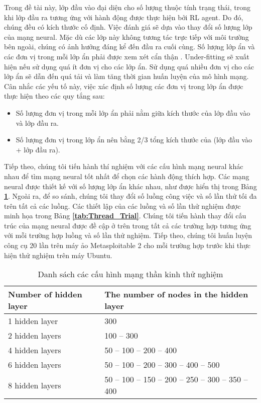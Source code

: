 Trong đề tài này, lớp đầu vào đại diện cho số lượng thuộc tính trạng thái, trong khi lớp đầu ra tương ứng với hành động được thực hiện bởi RL agent. Do đó, chúng đều có kích thước cố định. Việc đánh giá sẽ dựa vào thay đổi số lượng lớp của mạng neural. Mặc dù các lớp này không tương tác trực tiếp với môi trường bên ngoài, chúng có ảnh hưởng đáng kể đến đầu ra cuối cùng. Số lượng lớp ẩn và các đơn vị trong mỗi lớp ẩn phải được xem xét cẩn thận \cite{heaton2008introduction}. Under-fitting \cite{jabbar2015methods} sẽ xuất hiện nếu sử dụng quá ít đơn vị cho các lớp ẩn. Sử dụng quá nhiều đơn vị cho các lớp ẩn sẽ dẫn đến quá tải và làm tăng thời gian huấn luyện của mô hình mạng. Cân nhắc các yếu tố này, việc xác định số lượng các đơn vị trong lớp ẩn được thực hiện theo các quy tắng sau: 
\begin{itemize}
    \item Số lượng đơn vị trong mỗi lớp ẩn phải nằm giữa kích thước của lớp đầu vào và lớp đầu ra. 
    \item Số lượng đơn vị trong lớp ẩn nên bằng 2/3 tổng kích thước của (lớp đầu vào + lớp đầu ra). 
\end{itemize}

Tiếp theo, chúng tôi tiến hành thí nghiệm với các cấu hình mạng neural khác nhau để tìm mạng neural tốt nhất để chọn các hành động thích hợp. Các mạng neural được thiết kế với số lượng lớp ẩn khác nhau, như được hiển thị trong Bảng \textbf{\ref{tab:NN_TB}}.  Ngoài ra, để so sánh, chúng tôi thay đổi số luồng công việc và số lần thử tối đa trên tất cả các luồng. Các thiết lập của các luồng và số lần thử nghiệm được minh họa trong Bảng \textbf{\ref{tab:Thread_Trial}}. Chúng tôi tiến hành thay đổi cấu trúc của mạng neural được đề cập ở trên trong tất cả các trường hợp tương ứng với mỗi trường hợp luồng và số lần thử nghiệm. Tiếp theo, chúng tôi huấn luyện công cụ 20 lần trên máy ảo Metasploitable 2 cho mỗi trường hợp trước khi thực hiện thử nghiệm trên máy Ubuntu.

\begin{table}[!t]
    \centering
    \caption{Danh sách các cấu hình mạng thần kinh thử nghiệm}
    \label{tab:NN_TB}
    \begin{tabular}{|m{}|m{}|}
    \hline
    \textbf{Number of hidden layer} &\textbf{The number of nodes in the hidden layer} \\ 
    \hline
    1 hidden layer &  300                                           \\ 
    \hline
    2 hidden layers & 100 – 300                                     \\ 
    \hline
    4 hidden layers & 50 – 100 – 200 – 400                          \\ 
    \hline
    6 hidden layers & 50 – 100 – 200 – 300 – 400 – 500              \\ 
    \hline
    8 hidden layers & 50 – 100 – 150 – 200 – 250 – 300 – 350 – 400  \\ 
    \hline
    \end{tabular}
\end{table}

